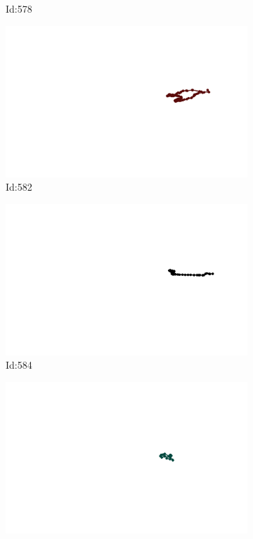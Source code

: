 \documentclass[12pt,twoside]{report}
\begin{document}
\begin{figure}
\begin{subfigure}[b]{0.20\textwidth}
\caption{Id:578}
\end{subfigure}
\begin{subfigure}[b]{0.20\textwidth}
\centering
\includegraphics[width=\textwidth]{../trajectories/582.png}
\caption{Id:582}
\end{subfigure}
\begin{subfigure}[b]{0.20\textwidth}
\centering
\includegraphics[width=\textwidth]{../trajectories/584.png}
\caption{Id:584}
\end{subfigure}
\begin{subfigure}[b]{0.20\textwidth}
\centering
\includegraphics[width=\textwidth]{../trajectories/629.png}

\end{subfigure}
\end{figure}
\end{document}
